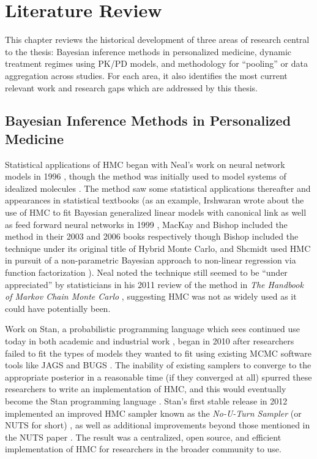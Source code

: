 \chapter{Literature Review}

This chapter reviews the historical development of three areas of research central to the thesis: Bayesian inference methods in personalized medicine, dynamic treatment regimes using PK/PD models, and methodology for “pooling” or data aggregation across studies. For each area, it also identifies the most current relevant work and research gaps which are addressed by this thesis.



\section{Bayesian Inference Methods in Personalized Medicine}

Statistical applications of HMC began with Neal's work on neural network models in 1996 \cite{Neal1996-vn, brooks2011handbook}, though the method was initially used to model systems of idealized molecules \cite{duane1987hybrid}. The method saw some statistical applications thereafter and appearances in statistical textbooks (as an example, Irshwaran wrote about the use of HMC to fit Bayesian generalized linear models with canonical link as well as feed forward neural networks in 1999 \cite{ishwaran1999applications}, MacKay \cite[Chapter~30]{mackay2003information} and Bishop \cite[Chapter~11]{Bishop2006pattern} included the method in their 2003 and 2006 books respectively though Bishop included the technique under its original title of Hybrid Monte Carlo, and Shcmidt used HMC in pursuit of a non-parametric Bayesian approach to non-linear regression via function factorization \cite{schmidt2009function}). Neal noted the technique still seemed to be ``under appreciated'' by statisticians in his 2011 review of the method in \textit{The Handbook of Markov Chain Monte Carlo} \cite[Chapter~5]{brooks2011handbook}, suggesting HMC was not as widely used as it could have potentially been.

Work on Stan, a probabilistic programming language which sees continued use today in both academic and industrial work \cite{betancourt2014geometric}, began in 2010 \cite{stan2012} after researchers failed to fit the types of models they wanted to fit using existing MCMC software tools like JAGS \cite{plummer2003jags} and BUGS \cite{lunn2000winbugs}.  The inability of existing samplers to converge to the appropriate posterior in a reasonable time (if they converged at all) spurred these researchers to write an implementation of HMC, and this would eventually become the Stan programming language \cite{stan2012}.  Stan's first stable release in 2012 \cite{stan2012} implemented an improved HMC sampler known as the \textit{No-U-Turn Sampler} (or NUTS for short) \cite{stan2012, hoffman2014no}, as well as additional improvements beyond those mentioned in the NUTS paper \cite{stan2012}.  The result was a centralized, open source, and efficient implementation of HMC for researchers in the broader community to use.

